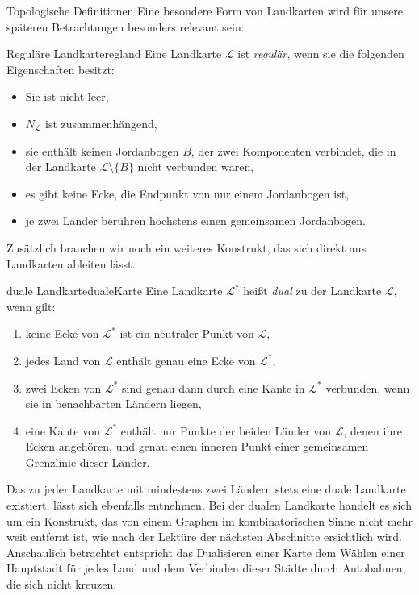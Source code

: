 \begin{section}{Topologische Definitionen}
 Eine besondere Form von Landkarten wird für unsere späteren Betrachtungen besonders relevant sein:
 
 \begin{definitionl}{Reguläre Landkarte}{regland}
  Eine Landkarte $\mathcal{L}$ ist \textit{regulär}, wenn sie die folgenden Eigenschaften besitzt:
  \begin{itemize}
   \item Sie ist nicht leer,
   \item $N_{\mathcal{L}}$ ist zusammenhängend,
   \item sie enthält keinen Jordanbogen $B$, der zwei Komponenten verbindet, die in der Landkarte $\mathcal{L} \setminus \{B\}$ nicht verbunden wären,
   \item es gibt keine Ecke, die Endpunkt von nur einem Jordanbogen ist,
   \item je zwei Länder berühren höchstens einen gemeinsamen Jordanbogen.
  \end{itemize}
 \end{definitionl}
 
 Zusätzlich brauchen wir noch ein weiteres Konstrukt, das sich direkt aus Landkarten ableiten lässt.

 \begin{definitionl}{duale Landkarte}{dualeKarte}
  Eine Landkarte $\mathcal{L}^*$ heißt \textit{dual} zu der Landkarte $\mathcal{L}$, wenn gilt:
  \begin{enumerate}
   \item keine Ecke von $\mathcal{L}^*$ ist ein neutraler Punkt von $\mathcal{L}$,
   \item jedes Land von $\mathcal{L}$ enthält genau eine Ecke von $\mathcal{L}^*$,
   \item zwei Ecken von $\mathcal{L}^*$ sind genau dann durch eine Kante in $\mathcal{L}^*$ verbunden, wenn sie in benachbarten Ländern liegen,
   \item eine Kante von $\mathcal{L}^*$ enthält nur Punkte der beiden Länder von $\mathcal{L}$, denen ihre Ecken angehören, und genau einen inneren Punkt einer gemeinsamen Grenzlinie dieser Länder.
  \end{enumerate}
 \end{definitionl}
 
 Das zu jeder Landkarte mit mindestens zwei Ländern stets eine duale Landkarte existiert, lässt sich ebenfalls \cite{fritsch} entnehmen. Bei der dualen Landkarte handelt es sich um ein Konstrukt, das von einem Graphen im kombinatorischen Sinne nicht mehr weit entfernt ist, wie nach der Lektüre der nächsten Abschnitte ersichtlich wird. Anschaulich betrachtet entspricht das Dualisieren einer Karte dem Wählen einer Hauptstadt für jedes Land und dem Verbinden dieser Städte durch Autobahnen, die sich nicht kreuzen.
 

\end{section}
